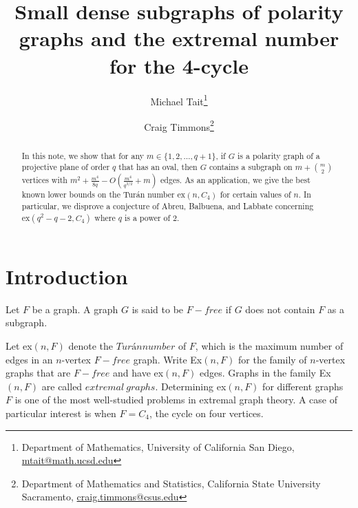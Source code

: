 \documentclass[12pt]{article}
\date{}
\title{Small dense subgraphs of polarity graphs and the extremal number for the 4-cycle}
\author{
    Michael Tait\thanks{Department of Mathematics, University of California San Diego, \url{mtait@math.ucsd.edu}}
    \and
    Craig Timmons\thanks{Department of Mathematics and Statistics, California State University Sacramento, \mbox{\url{craig.timmons@csus.edu}}}
}
\begin{document}
\maketitle

\begin{abstract}
    In this note, we show that for any $m \in \{1,2, \dots , q +1 \}$, if $G$ is a polarity graph of a projective plane of order $q$ that has an oval, then $G$ contains a subgraph on $m + \binom{m}{2}$ vertices with $m^2+\frac{m^4}{8q} - O ( \frac{m^4}{q^{3/2} } +m )$ edges. As an application, we give the best known lower bounds on the Tur\'{a}n number $\mathrm{ex}(n, C_4)$ for certain values of $n$. In particular, we disprove a conjecture of Abreu, Balbuena, and Labbate concerning $\mathrm{ex}(q^2-q-2, C_4)$ where $q$ is a power of $2$.
\end{abstract}

\section{Introduction}

Let $F$ be a graph. A graph $G$ is said to be $F-free$ if $G$ does not contain $F$ as a subgraph.

Let ex$(n, F)$ denote the $Turán number$ of $F$, which is the maximum number of edges
in an $n$-vertex $F-free$ graph. Write Ex$(n, F )$ for the family of $n$-vertex graphs that
are $F-free$ and have ex$(n, F)$ edges. Graphs in the family Ex$(n, F)$ are called $extremal\
    graphs$. Determining ex$(n, F)$ for different graphs $F$ is one of the most well-studied
problems in extremal graph theory. A case of particular interest is when $F = C_4$,
the cycle on four vertices.






\end{document}
